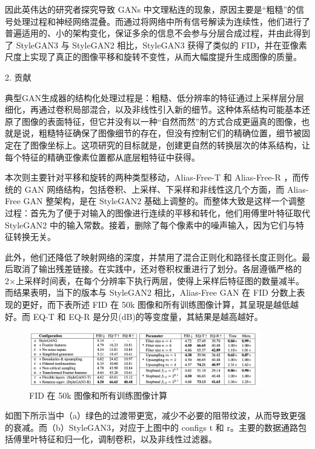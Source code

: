 因此英伟达的研究者探究导致 GANs 中文理粘连的现象，原因主要是“粗糙”的信号处理过程和神经网络混叠。而通过将网络中所有信号解读为连续性，他们进行了普遍适用的、小的架构变化，保证多余的信息不会参与分层合成过程，并由此得到了 StyleGAN3 与 StyleGAN2 相比，StyleGAN3 获得了类似的 FID，并在亚像素尺度上实现了真正的图像平移和旋转不变性，从而大幅度提升生成图像的质量。

2. 贡献

典型GAN生成器的结构化处理过程是：粗糙、低分辨率的特征通过上采样层分层细化，再通过卷积局部混合，以及非线性引入新的细节。这种体系结构可能基本还原了图像的表面特征，但它并没有以一种“自然而然”的方式合成更逼真的图像，也就是说，粗糙特征确保了图像细节的存在，但没有控制它们的精确位置，细节被固定在了图像坐标上。这项研究的目标就是，创建更自然的转换层次的体系结构，让每个特征的精确亚像素位置都从底层粗特征中获得。

本次则主要针对平移和旋转的两种类型移动，Alias-Free-T 和 Alias-Free-R
，而传统的 GAN 网络结构，包括卷积、上采样、下采样和非线性这几个方面，而 Alias-Free GAN 整架构，是在 StyleGAN2 基础上调整的。而整体大致是这样一个调整过程：首先为了便于对输入的图像进行连续的平移和转化，他们用傅里叶特征取代 StyleGAN2 中的输入常数。接着，删除了每个像素中的噪声输入，因为它们与特征转换无关。

此外，他们还降低了映射网络的深度，并禁用了混合正则化和路径长度正则化。最后取消了输出残差链接。在实践中，还对卷积权重进行了划分。各层遵循严格的2×上采样时间表，在每个分辨率下执行两层，使得上采样后特征图的数量减半。而结果表明，当下的版本与 StyleGAN2 相比，Alias-Free GAN 在 FID 分数上表现的更好，而下表所述 FID 在 50k 图像和所有训练图像计算，其呈現是越低越好。而 EQ-T 和 EQ-R 是分贝(dB)的等变度量，其結果是越高越好。

\begin{figure}[htb]
\centering 
\includegraphics[width=0.9\textwidth]{img/m2t21.png} 
\caption{FID 在 50k 图像和所有训练图像计算}
\label{Test}
\end{figure}

如图下所示当中（a）绿色的过渡带更宽，减少不必要的阻带纹波，从而导致更强的衰减。而（b）StyleGAN3，对应于上图中的 configs t 和 r。主要的数据通路包括傅里叶特征和归一化，调制卷积，以及非线性过滤器。


